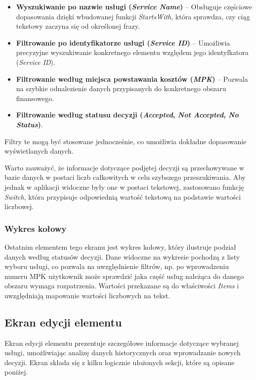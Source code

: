 \begin{itemize}
    \item \textbf{Wyszukiwanie po nazwie usługi (\emph{Service Name})} -- Obsługuje częściowe dopasowania dzięki wbudowanej funkcji \emph{StartsWith}, która sprawdza, czy ciąg tekstowy zaczyna się od określonej frazy.
    \item \textbf{Filtrowanie po identyfikatorze usługi (\emph{Service ID})} -- Umożliwia precyzyjne wyszukiwanie konkretnego elementu względem jego identyfkatora (\emph{Service ID}).
    \item \textbf{Filtrowanie według miejsca powstawania kosztów (\emph{MPK})} -- Pozwala na szybkie odnalezienie danych przypisanych do konkretnego obszaru finansowego.
    \item \textbf{Filtrowanie według statusu decyzji (\emph{Accepted}, \emph{Not Accepted}, \emph{No Status})}.
\end{itemize}

Filtry te mogą być stosowane jednocześnie, co umożliwia dokładne dopasowanie wyświetlanych danych.

Warto zauważyć, że informacje dotyczące podjętej decyzji są przechowywane w bazie danych w postaci liczb całkowitych w celu szybszego przeszukiwania. Aby jednak w aplikacji widoczne były one w postaci tekstowej, zastosowano funkcję \emph{Switch}, która przypisuje odpowiednią wartość tekstową na podstawie wartości liczbowej.

\subsubsection*{Wykres kołowy}
\par
Ostatnim elementem tego ekranu jest wykres kołowy, który ilustruje podział danych według statusów decyzji.
Dane widoczne na wykresie pochodzą z listy wyboru usługi, co pozwala na uwzględnienie filtrów, np. po wprowadzeniu numeru MPK użytkownik może sprawdzić jaka część usług należąca do danego obszaru wymaga rozpatrzenia. Wartości przekazane są do właściwości \emph{Items} i uwzględniają mapowanie wartości liczbowych na tekst.



\subsection{Ekran edycji elementu}

Ekran edycji elementu prezentuje szczegółowe informacje dotyczące wybranej usługi, umożliwiając analizę danych historycznych oraz wprowadzanie nowych decyzji. Ekran składa się z kilku logicznie ułożonych sekcji, które są opisane poniżej.


